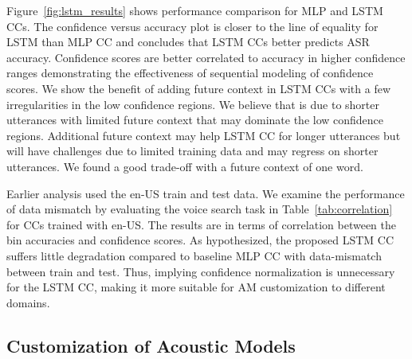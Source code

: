 \documentclass[a4paper]{article}
\begin{document}
Figure~\ref{fig:lstm_results} shows performance comparison for MLP and LSTM CCs. The confidence versus accuracy plot is closer to the line of equality for LSTM than MLP CC and concludes that LSTM CCs better predicts ASR accuracy. Confidence scores are better correlated to accuracy in higher confidence ranges demonstrating the effectiveness of sequential modeling of confidence scores. We show the benefit of adding future context in LSTM CCs with a few irregularities in the low confidence regions. We believe that is due to shorter utterances with limited future context that may dominate the low confidence regions. Additional future context may help LSTM CC for longer utterances but will have challenges due to limited training data and may regress on shorter utterances. We found a good trade-off with a future context of one word. 

Earlier analysis used the en-US train and test data. We examine the performance of data mismatch by evaluating the voice search task in Table~\ref{tab:correlation} for CCs trained with en-US. The results are in terms of correlation between the bin accuracies and confidence scores. As hypothesized, the proposed LSTM CC suffers little degradation compared to baseline MLP CC with data-mismatch between train and test. Thus, implying confidence normalization is unnecessary for the LSTM CC, making it more suitable for AM customization to different domains. 

\subsection{Customization of Acoustic Models}

\end{document}
